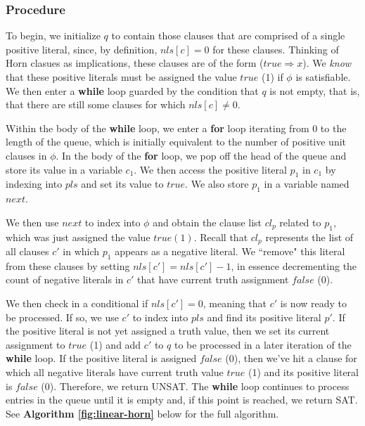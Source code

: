 \documentclass{article}
\begin{document}
\subsubsection{Procedure}

\medskip
\noindent To begin, we initialize $q$ to contain those clauses that are comprised of a single positive literal, since, by definition, $nls[c] = 0$ for these clauses. Thinking of Horn clasues as implications, these clauses are of the form ($true \Rightarrow x$). We \emph{know} that these positive literals must be assigned the value $true$ (1) if $\phi$ is satisfiable. We then enter a \textbf{while} loop guarded by the condition that $q$ is not empty, that is, that there are still some clauses for which $nls[c] \neq 0$.

\medskip
\noindent Within the body of the \textbf{while} loop, we enter a \textbf{for} loop iterating from 0 to the length of the queue, which is initially equivalent to the number of positive unit clauses in $\phi$. In the body of the \textbf{for} loop, we pop off the head of the queue and store its value in a variable $c_1$. We then access the positive literal $p_1$ in $c_1$ by indexing into $pls$ and set its value to $true$. We also store $p_1$ in a variable named $next$.

\medskip
\noindent We then use $next$ to index into $\phi$ and obtain the clause list $cl_p$ related to $p_1$, which was just assigned the value $true (1)$. Recall that $cl_p$ represents the list of all clauses $c'$ in which $p_1$ appears as a negative literal. We ``remove" this literal from these clauses by setting $nls[c'] = nls[c'] - 1$, in essence decrementing the count of negative literals in $c'$ that have current truth assignment $false$ (0).

\medskip
\noindent We then check in a conditional if $nls[c'] = 0$, meaning that $c'$ is now ready to be processed. If so, we use $c'$ to index into $pls$ and find its positive literal $p'$. If the positive literal is not yet assigned a truth value, then we set its current assignment to $true$ (1) and add $c'$ to $q$ to be processed in a later iteration of the \textbf{while} loop. If the positive literal is assigned $false$ (0), then we've hit a clause for which all negative literals have current truth value $true$ (1) and its positive literal is $false$ (0). Therefore, we return UNSAT. The \textbf{while} loop continues to process entries in the queue until it is empty and, if this point is reached, we return SAT. See \textbf{Algorithm \ref{fig:linear-horn}} below for the full algorithm.
\end{document}
